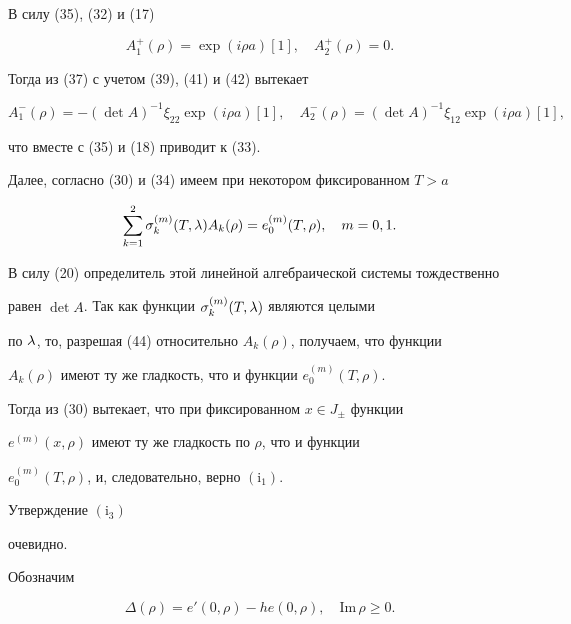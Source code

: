 \begin{pf}
В силу (35), (32) и (17)


\begin{equation}


A_1^{+}(\rho)=\exp(i\rho a)[1],\quad A_2^{+}(\rho)=0.


\end{equation}


Тогда из (37) с учетом (39), (41) и (42) вытекает


$$


A_1^{-}(\rho)=-(\det A)^{-1}\xi_{22}\exp(i\rho a)[1],\quad


A_2^{-}(\rho)=(\det A)^{-1}\xi_{12}\exp(i\rho a)[1],


$$


что вместе с (35) и (18) приводит к (33).





Далее, согласно (30) и (34) имеем при некотором фиксированном $T>a$


\begin{equation}


\sum_{k=1}^{2}\sigma_{k}^{(m)}(T,\la)A_k(\rho)


=e_0^{(m)}(T,\rho),\quad m=0,1.


\end{equation}


В силу (20) определитель этой линейной алгебраической системы тождественно


равен $\det A$. Так как функции $\sigma_{k}^{(m)}(T,\lambda)$ являются целыми


по $\lambda$, то, разрешая (44) относительно $A_k(\rho)$, получаем, что функции


$A_k(\rho)$ имеют ту же гладкость, что и функции $e_0^{(m)}(T,\rho)$.


Тогда из (30) вытекает, что при фиксированном $x\in J_{\pm}$ функции


$e^{(m)}(x,\rho)$ имеют ту же гладкость по $\rho$, что и функции


$e_0^{(m)}(T,\rho)$, и, следовательно, верно $(\mathrm i_1)$.


Утверждение $(\mathrm i_3)$


очевидно.


\end{pf}





Обозначим


\begin{equation}


\Delta(\rho)=e'(0,\rho)-he(0,\rho),\quad \mbox{Im}\,\rho\ge 0.


\end{equation}



